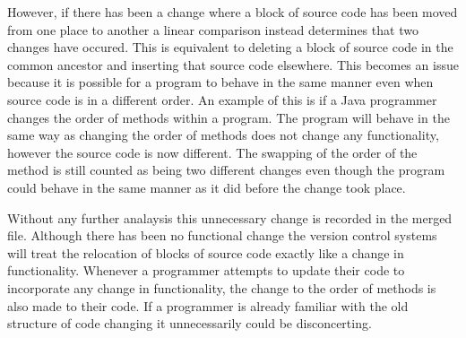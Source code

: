

However, if there has been a change where a block of source code has been moved from one place to another a linear comparison instead determines that two changes have occured.  This is equivalent to deleting a block of source code in the common ancestor and inserting that source code elsewhere. This becomes an issue because it is possible for a program to behave in the same manner even when source code is in a different order.  An example of this is if a Java programmer changes the order of methods within a program.  The program will behave in the same way as changing the order of methods does not change any functionality, however the source code is now different. The swapping of the order of the method is still counted as being two different changes even though the program could behave in the same manner as it did before the change took place.

Without any further analaysis this unnecessary change is recorded in the merged file.  Although there has been no functional change the version control systems will treat the relocation of blocks of source code exactly like a change in functionality.  Whenever a programmer attempts to update their code to incorporate any change in functionality, the change to the order of methods is also made to their code.  If a programmer is already familiar with the old structure of code changing it unnecessarily could be disconcerting.   

